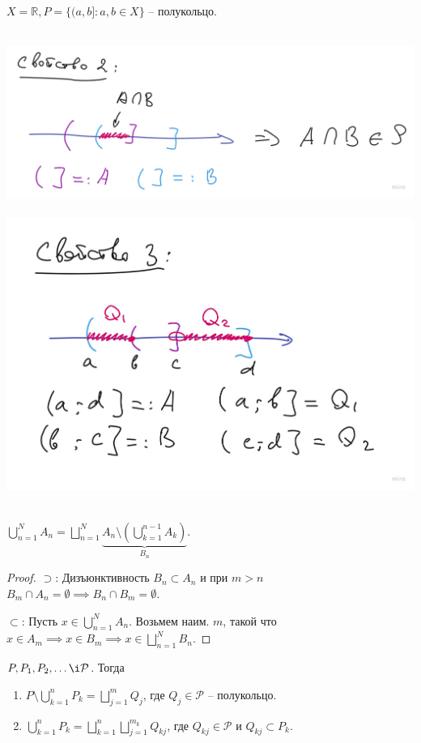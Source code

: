 \begin{example}
    $X = \mathbb{R}, P = \{(a, b] : a, b \in X\}$ -- полукольцо.

    \hbox{
        \includegraphics[scale=0.15]{./assets/01-measure-theory/semicircle-prop-2.jpg}
    }
    \hbox{
        \includegraphics[scale=0.15]{./assets/01-measure-theory/semicircle-prop-3.jpg}
    }

\end{example}

\begin{lemma}
    $\bigcup_{n=1}^{N} A_n = \bigsqcup_{n=1}^{N}\underbrace{A_n \setminus \left(\bigcup_{k=1}^{n-1}A_k\right)}_{B_n}$.
\end{lemma}
\begin{proof}
    $\supset$: Дизъюнктивность $B_n \subset A_n $ и при $m > n$ $B_m \cap A_n = \emptyset \implies B_n \cap B_m = \emptyset$.
    
    $\subset$: Пусть $x \in \bigcup_{n=1}^{N} A_n$. Возьмем наим. $m$, такой что $x \in A_m \implies x \in B_m \implies x \in \bigsqcup_{n=1}^{N} B_n$.
\end{proof}

\begin{theorem}
    $P, P_1, P_2, \dots \i \mathcal{P}$. Тогда 

    \begin{enumerate}
        \item $P \setminus \bigcup_{k=1}^{n} P_k = \bigsqcup_{j=1}^m Q_j$, где $Q_j \in \mathcal{P}$ -- полукольцо.
        \item $\bigcup_{k=1}^{n} P_k = \bigsqcup_{k=1}^{n} \bigsqcup_{j=1}^{m_k} Q_{kj}$, где $Q_{kj} \in \mathcal{P}$ и $Q_{kj} \subset P_k$. 
    \end{enumerate}
\end{theorem}

